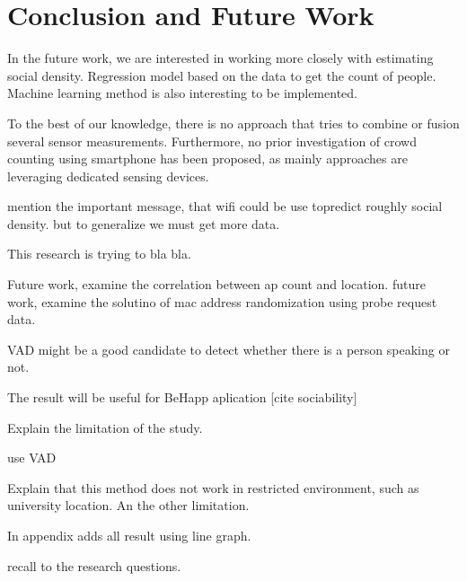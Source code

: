 \chapter{Conclusion and Future Work}
\label{ch:conclusion-future-work} %
In the future work, we are interested in working more closely with estimating social density. Regression model based on the data to get the count of people. Machine learning method is also interesting to be implemented.

To the best of our knowledge, there is no approach that tries to combine or fusion several sensor measurements. Furthermore, no prior investigation of crowd counting using smartphone has been proposed, as mainly approaches are leveraging dedicated sensing devices.

mention the important message, that wifi could be use topredict roughly social density. but to generalize we must get more data.

This research is trying to bla bla.

Future work, examine the correlation between ap count and location.
future work, examine the solutino of mac address randomization using probe request data.

VAD might be a good candidate to detect whether there is a person speaking or not.

The result will be useful for BeHapp aplication [cite sociability]

Explain the limitation of the study.

use VAD

Explain that this method does not work in restricted environment, such as university location.
An the other limitation.

In appendix adds all result using line graph.

recall to the research questions.

